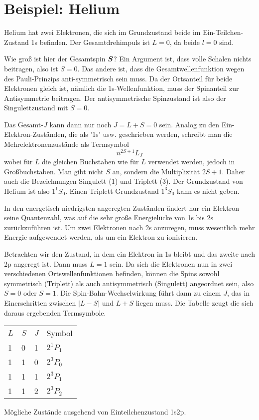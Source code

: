 \section{Beispiel: Helium}

Helium hat zwei Elektronen, die sich im Grundzustand beide im Ein-Teilchen-Zustand 1s befinden. Der Gesamtdrehimpuls ist $L=0$, da beide $l=0$ sind.

Wie groß ist hier der Gesamtspin $\boldsymbol{S}$? Ein Argument ist, dass volle Schalen nichts beitragen, also ist $S=0$. Das andere ist, dass die Gesamtwellenfunktion wegen des Pauli-Prinzips anti-symmetrisch sein muss. Da der Ortsanteil für beide Elektronen gleich ist, nämlich die 1s-Wellenfunktion, muss der Spinanteil zur Antisymmetrie beitragen. Der antisymmetrische Spinzustand ist also der Singulettzustand mit $S=0$.

Das Gesamt-$J$ kann dann nur noch $J  = L + S = 0$ sein.  Analog zu den Ein-Elektron-Zuständen, die als '1s' usw. geschrieben werden, schreibt man die Mehrelektronenzustände als Termsymbol
\begin{equation}
    n^{2S + 1}L_{J}
\end{equation}
wobei für $L$ die gleichen Buchstaben wie für $L$ verwendet werden, jedoch in Großbuchstaben. Man gibt nicht $S$ an, sondern die Multiplizität $2S+1$. Daher auch die Bezeichnungen Singulett (1) und Triplett (3). Der Grundzustand von Helium ist also $1^1S_0$. Einen Triplett-Grundzustand $1^3S_0$ kann es nicht geben.

In den energetisch niedrigsten angeregten Zuständen ändert nur ein Elektron seine Quantenzahl, was auf die sehr große Energielücke von 1s bis 2s zurückzuführen ist. Um zwei Elektronen nach 2s anzuregen, muss wesentlich mehr Energie aufgewendet werden, als um ein Elektron zu ionisieren.

Betrachten wir den Zustand, in dem ein Elektron in 1s bleibt und das zweite nach 2p angeregt ist. Dann muss $L=1$ sein. Da sich die Elektronen nun in zwei verschiedenen Ortswellenfunktionen befinden, können die Spins sowohl symmetrisch (Triplett) als auch antisymmetrisch (Singulett) angeordnet sein, also $S=0$ oder $S=1$. Die Spin-Bahn-Wechselwirkung führt dann zu einem $J$, das in Einerschritten zwischen $|L - S|$ und $L+S$ liegen muss. Die Tabelle zeugt die sich daraus ergebenden Termsymbole.

\begin{marginfigure}
   \begin{tabular}{llll}
    $L$ & $S$ & $J$ & Symbol \\
    1   & 0  &  1 & $2^1P_1$ \\
    1   & 1 &  0 & $2^3P_0$ \\
    1   & 1  &  1 & $2^3P_1$ \\
    1   & 1  &  2 & $2^3P_2$ \\
\end{tabular} 
\vspace*{2mm}

\caption{Mögliche Zustände ausgehend von Einteilchenzustand 1s2p.}
\end{marginfigure}

